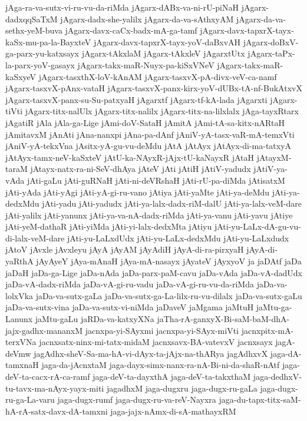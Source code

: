 {jAga-ra-va-sutx-vi-ru-vu-da-riMda
jAgarx-dABx-va-ni-rU-piNaH
jAgarx-dadxqqSaTxM
jAgarx-dadx-she-yalilx
jAgarx-da-va-sAthxyAM
jAgarx-da-va-sethx-yeM-buva
jAgarx-davx-caCx-badx-mA-ga-tamf
jAgarx-davx-tapxrX-tayx-kaSx-mu-pa-la-BayxteV
jAgarx-davx-tapxrX-tayx-yoV-daBxvAH
jAgarx-doBxV-ga-parx-yu-katxsayx
jAgarx-tAkxlaM
jAgarx-tAkxleV
jAgarxtUtx
jAgarx-taPx-la-parx-yoV-gasayx
jAgarx-takx-maR-Nuyx-pa-kiSxVNeV
jAgarx-takx-maR-kaSxyeV
jAgarx-tasxthX-loV-kAnAM
jAgarx-tasxvX-pA-divx-veV-ca-namf
jAgarx-tasxvX-pAnx-vataH
jAgarx-tasxvX-panx-kirx-yoV-dUBx-tA-nf-BukAtxvX
jAgarx-tasxvX-panx-su-Su-patxyaH
jAgarxtf
jAgarx-tf-kA-lada
jAgarxti
jAgarx-tiVti
jAgarx-titx-nalUlx
jAgarx-titx-nalilx
jAgarx-titx-na-lilxlalx
jAga-tayxRtarx
jAgatiR
jAla
jAla-ga-Lige
jAmi-doV-SataH
jAmitA
jAmi-tA-sa-kitx-nARtaH
jAmitavxM
jAnAti
jAna-nanxpi
jAna-pa-dAnf
jAniV-yA-tasx-vaR-mA-temxVti
jAniV-yA-tekxVna
jAsitx-yA-gu-vu-deMdu
jAtA
jAtAyx
jAtAyx-di-ma-tatxyA
jAtAyx-tamx-neV-kaSxteV
jAtU-ka-NAyxR-jAjx-tU-kaNayxR
jAtaH
jAtayxM-taraM
jAtayx-natx-ra-ni-SeV-dhAya
jAteV
jAti
jAtiH
jAtiV-yadudx
jAtiV-ya-vAda
jAti-gaLu
jAti-guRNaH
jAti-ni-deVRshaH
jAti-rU-pa-diMda
jAtisatxM
jAti-yAda
jAti-yAgi
jAti-yA-gi-ru-vano
jAtiya
jAti-yaMte
jAti-ya-deMdu
jAti-ya-dedxMdu
jAti-yadu
jAti-yadudx
jAti-ya-lalx-dadx-riM-dalU
jAti-ya-lalx-veM-dare
jAti-yalilx
jAti-yanunx
jAti-ya-va-nA-dadx-riMda
jAti-ya-vanu
jAti-yavu
jAtiye
jAti-yeM-dathaR
jAti-yiMda
jAti-yi-lalx-dedxMta
jAtiyu
jAti-yu-LaLx-dA-gu-vu-di-lalx-veM-dare
jAti-yu-LaLxdUdx
jAti-yu-LaLx-dedxMdu
jAti-yu-LaLxdudx
jAtoV
jAvxle
jAvxleyu
jAyA
jAyAM
jAyAdiH
jAyA-di-ra-pirxyaH
jAyA-di-yaRthA
jAyAyeY
jAya-mAnaH
jAya-mA-nasayx
jAyateV
jAyxyoV
ja
jaDAtf
jaDa
jaDaH
jaDa-ga-Lige
jaDa-nAda
jaDa-parx-paM-cavu
jaDa-vAda
jaDa-vA-dadUdx
jaDa-vA-dadx-riMda
jaDa-vA-gi-ru-vadu
jaDa-vA-gi-ru-vu-da-riMda
jaDa-va-lolxVka
jaDa-va-sutx-gaLa
jaDa-va-sutx-ga-La-lilx-ru-vu-dilalx
jaDa-va-sutx-gaLu
jaDa-va-sutx-vina
jaDa-va-sutx-vi-niMda
jaDaveV
jaMgama
jaMtuH
jaMtu-ga-Lanunx
jaMtu-gaLu
jaRDa-va-katxyXNa
jaTha-rA-ganxyX-Bi-saM-baM-dhA-jajx-gadhx-mananxM
jacnxpa-yi-SAyxmi
jacnxpa-yi-SAyx-miVti
jacnxpitx-mA-terxVNa
jacnxsatx-ninx-mi-tatx-midaM
jacnxsavx-BA-vatevxV
jacnxsayx
jagA-deVmw
jagAdhx-sheV-Sa-ma-hA-vi-dAyx-ta-jAjx-na-thARya
jagAdhxvX
jaga-dA-tamxnaH
jaga-da-jAcnxtaM
jaga-dayx-simx-nanx-ra-nA-Bi-ni-da-shaR-nAtf
jaga-deV-ta-cacx-rA-ca-ramf
jaga-deV-ta-dayxthA
jaga-deV-ta-takxthaM
jaga-dedhxV-tu-tavx-ma-nAyx-yayx-miti
jagadhxM
jaga-dugxru
jaga-dugx-ru-gaLa
jaga-dugx-ru-ga-La-varu
jaga-dugx-rumf
jaga-dugx-ru-va-reV-Nayxra
jaga-du-tapx-titx-saM-hA-rA-satx-davx-dA-tamxni
jaga-jajx-nAmx-di-sA-mathayxRM
}
